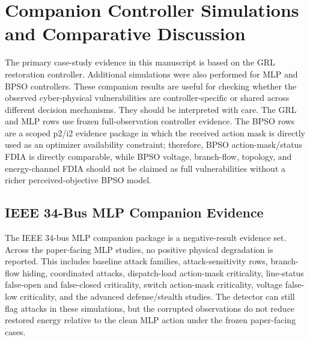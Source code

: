
\section{Companion Controller Simulations and Comparative Discussion}
\label{sec:companion_controller_results}

The primary case-study evidence in this manuscript is based on the GRL restoration controller. Additional simulations were also performed for MLP and BPSO controllers. These companion results are useful for checking whether the observed cyber-physical vulnerabilities are controller-specific or shared across different decision mechanisms. They should be interpreted with care. The GRL and MLP rows use frozen full-observation controller evidence. The BPSO rows are a scoped p2/i2 evidence package in which the received action mask is directly used as an optimizer availability constraint; therefore, BPSO action-mask/status FDIA is directly comparable, while BPSO voltage, branch-flow, topology, and energy-channel FDIA should not be claimed as full vulnerabilities without a richer perceived-objective BPSO model.

\subsection{IEEE 34-Bus MLP Companion Evidence}
\label{subsec:ieee34_mlp_companion}

The IEEE 34-bus MLP companion package is a negative-result evidence set. Across the paper-facing MLP studies, no positive physical degradation is reported. This includes baseline attack families, attack-sensitivity rows, branch-flow hiding, coordinated attacks, dispatch-load action-mask criticality, line-status false-open and false-closed criticality, switch action-mask criticality, voltage false-low criticality, and the advanced defense/stealth studies. The detector can still flag attacks in these simulations, but the corrupted observations do not reduce restored energy relative to the clean MLP action under the frozen paper-facing cases.

